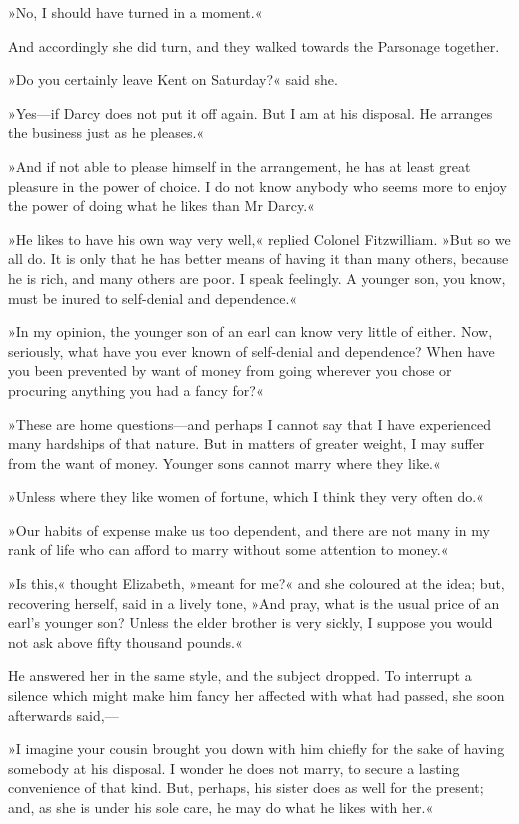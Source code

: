 »No, I should have turned in a moment.«

And accordingly she did turn, and they walked towards the Parsonage together.

»Do you certainly leave Kent on Saturday?« said she.

»Yes—if Darcy does not put it off again. But I am at his disposal. He arranges the business just as he pleases.«

»And if not able to please himself in the arrangement, he has at least great pleasure in the power of choice. I do not know anybody who seems more to enjoy the power of doing what he likes than Mr Darcy.«

»He likes to have his own way very well,« replied Colonel Fitzwilliam. »But so we all do. It is only that he has better means of having it than many others, because he is rich, and many others are poor. I speak feelingly. A younger son, you know, must be inured to self-denial and dependence.«

»In my opinion, the younger son of an earl can know very little of either. Now, seriously, what have you ever known of self-denial and dependence? When have you been prevented by want of money from going wherever you chose or procuring anything you had a fancy for?«

»These are home questions—and perhaps I cannot say that I have experienced many hardships of that nature. But in matters of greater weight, I may suffer from the want of money. Younger sons cannot marry where they like.«

»Unless where they like women of fortune, which I think they very often do.«

»Our habits of expense make us too dependent, and there are not many in my rank of life who can afford to marry without some attention to money.«

»Is this,« thought Elizabeth, »meant for me?« and she coloured at the idea; but, recovering herself, said in a lively tone, »And pray, what is the usual price of an earl's younger son? Unless the elder brother is very sickly, I suppose you would not ask above fifty thousand pounds.«

He answered her in the same style, and the subject dropped. To interrupt a silence which might make him fancy her affected with what had passed, she soon afterwards said,—

»I imagine your cousin brought you down with him chiefly for the sake of having somebody at his disposal. I wonder he does not marry, to secure a lasting convenience of that kind. But, perhaps, his sister does as well for the present; and, as she is under his sole care, he may do what he likes with her.«

